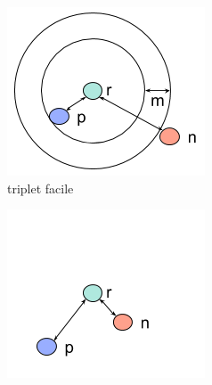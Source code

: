 \begin{figure}[htbp]

\begin{subfigure}{0.32\textwidth}
\includegraphics[width=\linewidth]{figures/exemplefaciles.png}
\caption{triplet facile} \label{fig:exemplefacile}
\end{subfigure}
\hspace*{\fill} %
\begin{subfigure}{0.32\textwidth}
\includegraphics[width=\linewidth]{figures/exempledifficile.png}

\end{subfigure}
\end{figure}
